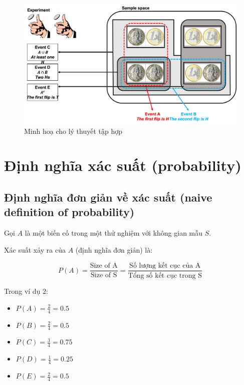 \documentclass[
]{book}
\providecommand{\tightlist}{%
  \setlength{\itemsep}{0pt}\setlength{\parskip}{0pt}}
\begin{document}
\begin{figure}

{\centering \includegraphics[width=1\linewidth]{figures/Picture03} 

}

\caption{Minh hoạ cho lý thuyết tập hợp}\label{fig:example3}
\end{figure}

\hypertarget{ux111ux1ecbnh-nghux129a-xuxe1c-suux1ea5t-probability}{%
\section{Định nghĩa xác suất (probability)}\label{ux111ux1ecbnh-nghux129a-xuxe1c-suux1ea5t-probability}}

\hypertarget{ux111ux1ecbnh-nghux129a-ux111ux1a1n-giux1ea3n-vux1ec1-xuxe1c-suux1ea5t-naive-definition-of-probability}{%
\subsection{Định nghĩa đơn giản về xác suất (naive definition of probability)}\label{ux111ux1ecbnh-nghux129a-ux111ux1a1n-giux1ea3n-vux1ec1-xuxe1c-suux1ea5t-naive-definition-of-probability}}

Gọi \(A\) là một biến cố trong một thử nghiệm với không gian mẫu \(S\).

Xác suất xảy ra của \(A\) (định nghĩa đơn giản) là:

\[
P(A) = \frac{\text{Size of A}}{\text{Size of S}} = \frac{\text{Số lượng kết cục của A}}{\text{Tổng số kết cục trong S}}
\]

Trong ví dụ 2:

\begin{itemize}
\tightlist
\item
  \(P(A) = \frac{2}{4} = 0.5\)
\item
  \(P(B) = \frac{2}{4} = 0.5\)
\item
  \(P(C) = \frac{3}{4} = 0.75\)
\item
  \(P(D) = \frac{1}{4} = 0.25\)
\item
  \(P(E) = \frac{2}{4} = 0.5\)
\end{itemize}
\end{document}
